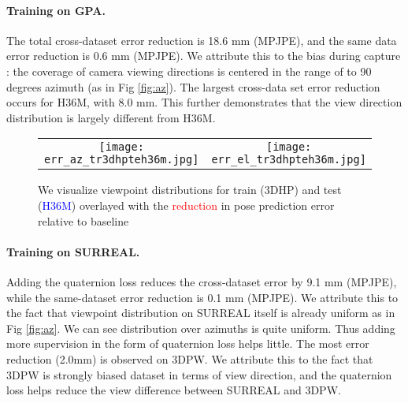 \documentclass[runningheads]{llncs}
\begin{document}
\paragraph{Training on GPA.} The total cross-dataset error reduction is 18.6 mm
(MPJPE), and the same data error reduction is 0.6 mm (MPJPE). We attribute this to
the bias during capture \cite{gpa}: the coverage of camera viewing directions
is centered in the range of  to 90 degrees azimuth (as in Fig
\ref{fig:az}). The largest cross-data set error reduction occurs for H36M, with 8.0
mm. This further demonstrates that the view direction distribution is largely
different from H36M. 





\begin{figure}[t]
\begin{center}
\begin{tabular}{cc}
\texttt{[image: err\_az\_tr3dhpteh36m.jpg]} &
\texttt{[image: err\_el\_tr3dhpteh36m.jpg]}
\end{tabular}
\end{center}
\caption{We visualize viewpoint distributions for train (3DHP) and test (\textcolor{blue}{H36M}) 
overlayed with the \textcolor{red}{reduction} in pose prediction error relative to baseline}
\label{fig:erroreduction}
\vspace{-0.15in}
\end{figure}

\paragraph{Training on SURREAL.} Adding the quaternion loss reduces the
cross-dataset error by 9.1 mm (MPJPE), while the same-dataset error reduction is 0.1
mm (MPJPE).  We attribute this to the fact that viewpoint distribution on
SURREAL itself is already uniform as in Fig \ref{fig:az}. We can see distribution
over azimuths is quite uniform. Thus adding more
supervision in the form of quaternion loss helps little. The most error
reduction (2.0mm) is observed on 3DPW. We attribute this
to the fact that 3DPW is strongly biased dataset in terms of view direction,
and the quaternion loss helps reduce the view difference between SURREAL and
3DPW. 
\end{document}
